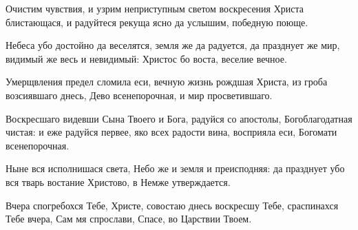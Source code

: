 \label{_content_pesnopeniya-izsluzhb-triodi-cvetnoy}

\begin{mymulticols}
 



Очистим чувствия, и узрим неприступным светом воскресения Христа блистающася, и радуйтеся рекуща ясно да услышим, победную поюще. 


Небеса убо достойно да веселятся, земля же да радуется, да празднует же мир, видимый же весь и невидимый: Христос бо воста, веселие вечное. 



Умерщвления предел сломила еси, вечную жизнь рождшая Христа, из гроба возсиявшаго днесь, Дево всенепорочная, и мир просветившаго.    


Воскресшаго видевши Сына Твоего и Бога, радуйся со апостолы, Богоблагодатная чистая: и еже радуйся первее, яко всех радости вина, восприяла еси, Богомати всенепорочная. 




Ныне вся исполнишася света, Небо же и земля и преисподняя: да празднует убо вся тварь востание Христово, в Немже утверждается. 


Вчера спогребохся Тебе, Христе, совостаю днесь воскресшу Тебе, сраспинахся Тебе вчера, Сам мя спрослави, Спасе, во Царствии Твоем. 


\end{mymulticols}
